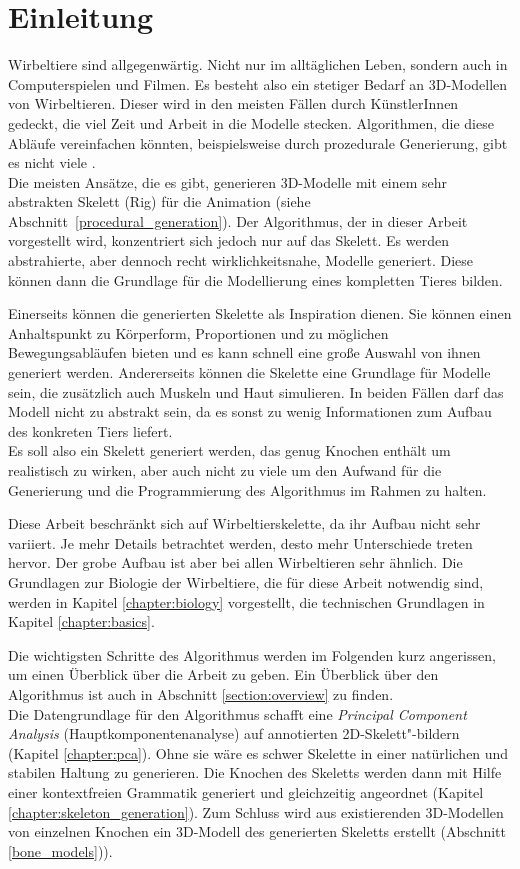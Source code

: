 \chapter{Einleitung}

Wirbeltiere sind allgegenwärtig. Nicht nur im alltäglichen Leben, sondern auch in Computerspielen und Filmen. Es besteht also ein stetiger Bedarf an 3D-Modellen von Wirbeltieren. Dieser wird in den meisten Fällen durch KünstlerInnen gedeckt, die viel Zeit und Arbeit in die Modelle stecken. 
Algorithmen, die diese Abläufe vereinfachen könnten, beispielsweise durch prozedurale Generierung, gibt es nicht viele \cite{PCGSurvey_videoGames}.\\
Die meisten Ansätze, die es gibt, generieren 3D-Modelle mit einem sehr abstrakten Skelett (Rig) für die Animation (siehe \mbox{Abschnitt \ref{procedural_generation}}). 
Der Algorithmus, der in dieser Arbeit vorgestellt wird, konzentriert sich jedoch nur auf das Skelett. Es werden abstrahierte, aber dennoch recht wirklichkeitsnahe, Modelle generiert. Diese können dann die Grundlage für die Modellierung eines kompletten Tieres bilden.

Einerseits können die generierten Skelette als Inspiration dienen. Sie können einen Anhaltspunkt zu Körperform, Proportionen und zu möglichen Bewegungsabläufen bieten und es kann schnell eine große Auswahl von ihnen generiert werden.
Andererseits können die Skelette eine Grundlage für Modelle sein, die zusätzlich auch Muskeln und Haut simulieren.
In beiden Fällen darf das Modell nicht zu abstrakt sein, da es sonst zu wenig Informationen zum Aufbau des konkreten Tiers liefert.\\
Es soll also ein Skelett generiert werden, das genug Knochen enthält um realistisch zu wirken, aber auch nicht zu viele um den Aufwand für die Generierung und die Programmierung des Algorithmus im Rahmen zu halten.

Diese Arbeit beschränkt sich auf Wirbeltierskelette, da ihr Aufbau nicht sehr variiert. 
Je mehr Details betrachtet werden, desto mehr Unterschiede treten hervor. Der grobe Aufbau ist aber bei allen Wirbeltieren sehr ähnlich. Die Grundlagen zur Biologie der Wirbeltiere, die für diese Arbeit notwendig sind, werden in Kapitel \ref{chapter:biology} vorgestellt, die technischen Grundlagen in Kapitel \ref{chapter:basics}.

Die wichtigsten Schritte des Algorithmus werden im Folgenden kurz angerissen, um einen Überblick über die Arbeit zu geben. Ein Überblick über den Algorithmus ist auch in Abschnitt \ref{section:overview} zu finden.\\
Die Datengrundlage für den Algorithmus schafft eine \emph{Principal Component Analysis} (Hauptkomponentenanalyse) auf annotierten 2D-Skelett"-bildern (Kapitel \ref{chapter:pca}). Ohne sie wäre es schwer Skelette in einer natürlichen und stabilen Haltung zu generieren.
Die Knochen des Skeletts werden dann mit Hilfe einer kontextfreien Grammatik generiert und gleichzeitig angeordnet (Kapitel \ref{chapter:skeleton_generation}). 
Zum Schluss wird aus existierenden 3D-Modellen von einzelnen Knochen ein 3D-Modell des generierten Skeletts erstellt (Abschnitt \ref{bone_models})).


